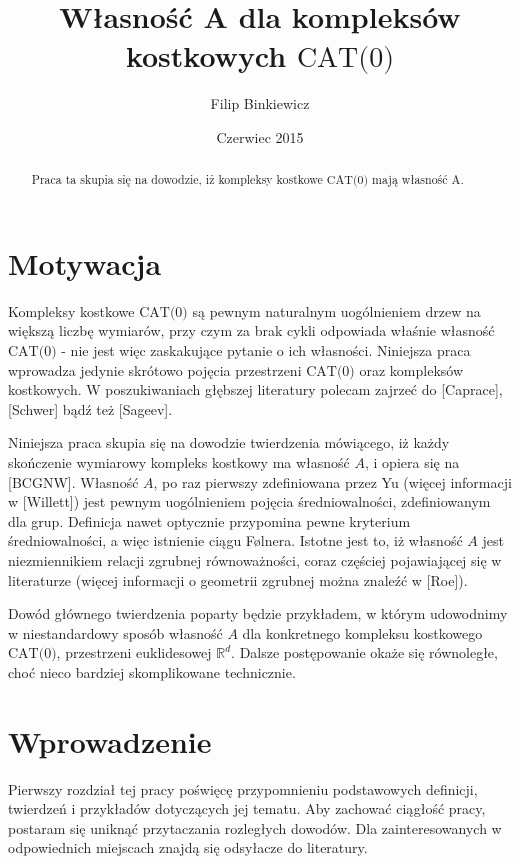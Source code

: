 \documentclass[licencjacka]{pracamgr}
\author{Filip Binkiewicz}
\title{Własność A dla kompleksów kostkowych $\text{CAT(0)}$}
\date{Czerwiec 2015}
\theoremstyle{definition}
\theoremstyle{definition}
\theoremstyle{definition}
\theoremstyle{definition}
\theoremstyle{definition}
\theoremstyle{plain}
\theoremstyle{plain}
\begin{document}
\maketitle


\begin{abstract}
	Praca ta skupia się na dowodzie, iż kompleksy kostkowe $\text{CAT(0)} $
	mają własność A.
\end{abstract}

\tableofcontents

\chapter*{Motywacja}

Kompleksy kostkowe $ \text{CAT(0)} $ są pewnym naturalnym uogólnieniem drzew na większą liczbę 
wymiarów, przy czym za brak cykli odpowiada właśnie własność $ \text{CAT(0)} $ - nie jest 
więc zaskakujące pytanie o ich własności. Niniejsza praca wprowadza jedynie skrótowo 
pojęcia przestrzeni $ \text{CAT(0)} $ oraz kompleksów kostkowych. W poszukiwaniach głębszej 
literatury polecam zajrzeć do [Caprace], [Schwer] bądź też [Sageev].

Niniejsza praca skupia się na dowodzie twierdzenia mówiącego, iż każdy skończenie 
wymiarowy kompleks kostkowy ma własność $ A $, i opiera się na [BCGNW]. Własność $ A $, 
po raz pierwszy zdefiniowana przez Yu (więcej informacji w [Willett]) 
jest pewnym uogólnieniem pojęcia średniowalności, zdefiniowanym dla grup. Definicja 
nawet optycznie przypomina pewne kryterium średniowalności, a więc istnienie 
ciągu Følnera. Istotne jest to, iż własność $ A $ jest niezmiennikiem relacji 
zgrubnej równoważności, coraz częściej pojawiającej się w literaturze (więcej informacji 
o geometrii zgrubnej można znaleźć w [Roe]).

Dowód głównego twierdzenia poparty będzie przykładem, w którym udowodnimy w niestandardowy 
sposób własność $ A $ dla konkretnego kompleksu kostkowego $ \text{CAT(0)} $, 
przestrzeni euklidesowej $ \mathbb{R}^d $. Dalsze postępowanie okaże się równoległe, choć 
nieco bardziej skomplikowane technicznie. 

\chapter{Wprowadzenie}

Pierwszy rozdział tej pracy poświęcę przypomnieniu podstawowych definicji, 
twierdzeń i przykładów dotyczących jej tematu. Aby zachować ciągłość pracy, 
postaram się uniknąć przytaczania rozległych dowodów. Dla zainteresowanych 
w odpowiednich miejscach znajdą się odsyłacze do literatury.
\end{document}

